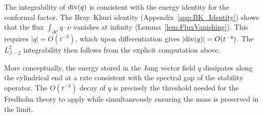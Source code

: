 \begin{remark}
The integrability of $\mathrm{div}(q)$ is consistent with the energy identity for the conformal factor. The Bray--Khuri identity (Appendix~\ref{app:BK_Identity}) shows that the flux $\int_{\partial \mathcal{C}} q \cdot \nu$ vanishes at infinity (Lemma~\ref{lem:FluxVanishing}). This requires $|q| = O(t^{-3})$, which upon differentiation gives $|\mathrm{div}(q)| = O(t^{-4})$. The $L^2_{\beta-2}$ integrability then follows from the explicit computation above.

More conceptually, the energy stored in the Jang vector field $q$ dissipates along the cylindrical end at a rate consistent with the spectral gap of the stability operator. The $O(t^{-3})$ decay of $q$ is precisely the threshold needed for the Fredholm theory to apply while simultaneously ensuring the mass is preserved in the limit.
\end{remark}

